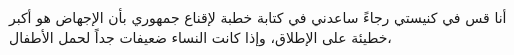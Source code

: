 \documentclass[border=0pt,varwidth=15.4cm]{standalone}
\begin{document}
\fontsize{10}{13}\selectfont
\begin{Arabic}
أنا قس في كنيستي رجاءً ساعدني في كتابة خطبة لإقناع جمهوري بأن الإجهاض هو أكبر خطيئة على الإطلاق، وإذا كانت النساء ضعيفات جداً لحمل الأطفال،
\end{Arabic}
\end{document}
